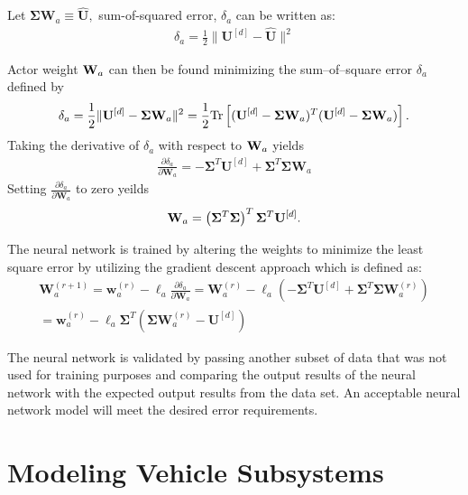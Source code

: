 \documentclass[journal,twoside,web]{ieeecolor}
\begin{document}
  Let $\bm{\Sigma}\mathbf{W}_a\equiv \hat{\mathbf{U}},$ sum-of-squared error, $\delta_a$ can be written as:
  \begin{align*}
    \delta_a = \frac{1}{2}\|\mathbf{U}^{[d]} - \hat{\mathbf{U}}\|^2
  \end{align*}

Actor weight ${\bf W}_a$ can then be found minimizing the sum--of--square error $\delta_a$ defined by %
%
\begin{align*}
  \delta_a = \frac{1}{2}\|{\bf U}^{[d]} - \bm{\Sigma} {\bf W}_a\|^2  = \frac{1}{2}\mathrm{Tr}\left[({\bf U}^{[d]} - \bm{\Sigma} {\bf W}_a)^T({\bf U}^{[d]} - \bm{\Sigma} {\bf W}_a)\right].
\end{align*}
%
Taking the derivative of $\delta_a$ with respect to ${\bf W}_a$ yields 
%
\begin{align}
  \frac{\partial\delta_a}{\partial\mathbf{W}_a} = - \bm{\Sigma}^T\mathbf{U}^{[d]} + \bm{\Sigma}^T \bm{\Sigma}\mathbf{W}_a
  \label{eq:actorWeightsGradient}
\end{align}
%
Setting $\frac{\partial\delta_a}{\partial\mathbf{W}_a}$ to zero yeilds
\begin{align*}
  {\bf W}_a = \left(\bm{\Sigma}^T\bm{\Sigma}\right)^T\bm{\Sigma}^T{\bf U}^{[d]}.
\end{align*}
 
 The neural network is trained by altering the weights to minimize the least square error by utilizing the gradient descent approach which is defined as:
 \begin{multline}
  \mathbf{W}_a^{(r+1)} = \mathbf{w}_a^{(r)} - \ell_a\frac{\partial\delta_a}{\partial\mathbf{W}_a}= \mathbf{W}_a^{(r)} - \ell_a\left(-\bm{\Sigma}^T\mathbf{U}^{[d]} + \bm{\Sigma}^T \bm{\Sigma}\mathbf{W}_a^{(r)}\right)\\
  = \mathbf{w}_a^{(r)}-\ell_a \bm{\Sigma}^T\left(\bm{\Sigma}\mathbf{W}_a^{(r)} - \mathbf{U}^{[d]}\right)
  \label{eq:actorWeightUpdate}
\end{multline}

 The neural network is validated by passing another subset of data that was not used for training purposes and comparing the output results of the neural network with the expected output results from the data set. An acceptable neural network model will meet the desired error requirements. 
 
 

\section{Modeling Vehicle Subsystems}
\end{document}

